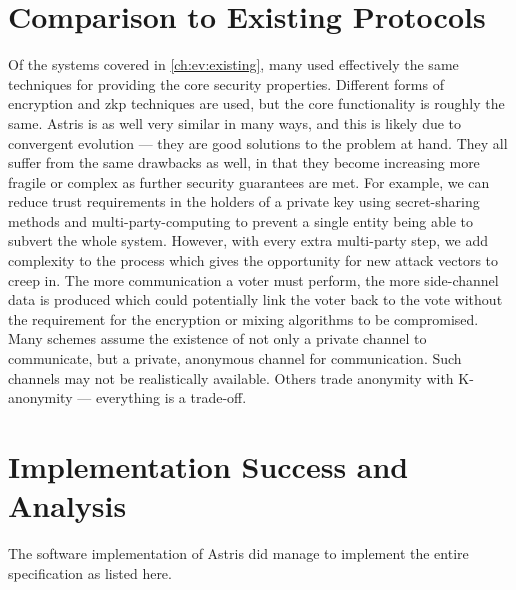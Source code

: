 \section{Comparison to Existing Protocols}
\label{ch:analysis:comparison}

Of the systems covered in \autoref{ch:ev:existing}, many used effectively the same techniques for providing the core security properties. Different forms of encryption and \gls{zkp} techniques are used, but the core functionality is roughly the same. Astris is as well very similar in many ways, and this is likely due to convergent evolution --- they are good solutions to the problem at hand. They all suffer from the same drawbacks as well, in that they become increasing more fragile or complex as further security guarantees are met. For example, we can reduce trust requirements in the holders of a private key using secret-sharing methods and multi-party-computing to prevent a single entity being able to subvert the whole system. However, with every extra multi-party step, we add complexity to the process which gives the opportunity for new attack vectors to creep in. The more communication a voter must perform, the more side-channel data is produced which could potentially link the voter back to the vote without the requirement for the encryption or mixing algorithms to be compromised. Many  schemes assume the existence of not only a private channel to communicate, but a private, anonymous channel for communication. Such channels may not be realistically available. Others trade anonymity with K-anonymity --- everything is a trade-off.



\section{Implementation Success and Analysis}
\label{ch:analysis:impl}

The software implementation of Astris did manage to implement the entire specification as listed here.


